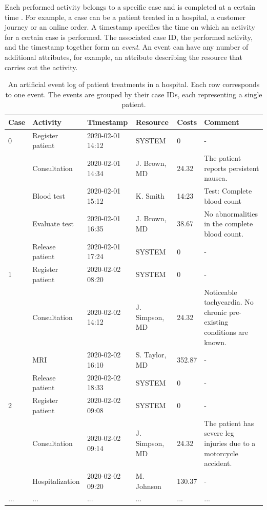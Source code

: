 Each performed activity belongs to a specific case and is completed at a certain time \cite{DBLP:conf/bpm/AalstAM11}.
For example, a case can be a patient treated in a hospital, a customer journey or an online order.
A timestamp specifies the time on which an activity for a certain case is performed.
The associated case ID, the performed activity, and the timestamp together form an \textit{event}.
An event can have any number of additional attributes, for example, an attribute describing the resource that carries out the activity.
\begin{table}[htbp!]
	\small
	\setlength\tabcolsep{3pt}
	\begin{tabularx}{\textwidth}{lllllp{4.5cm}}
		\toprule
		\textbf{Case} & \textbf{Activity}          & \textbf{Timestamp} & \textbf{Resource} & \textbf{Costs} & \textbf{Comment}  \\
		\midrule
		0                & Register patient           & 2020-02-01 14:12   & SYSTEM            & 0             & -     \\
		& Consultation               & 2020-02-01 14:34   & J. Brown, MD    & 24.32         & The patient reports persistent nausea.   \\
		& Blood test                 & 2020-02-01 15:12   & K. Smith         & 14:23         & Test: Complete blood count    \\
		& Evaluate test  & 2020-02-01 16:35   & J. Brown, MD    & 38.67         &No abnormalities in the complete blood count.   \\
		& Release patient            & 2020-02-01 17:24   & SYSTEM            & 0             & -  \\
		\midrule
		1                & Register patient           & 2020-02-02 08:20   & SYSTEM            & 0             & -  \\
		& Consultation               & 2020-02-02 14:12   & J. Simpson, MD  & 24.32         & Noticeable tachycardia. No chronic pre-existing conditions are known.    \\
		& MRI & 2020-02-02 16:10   & S. Taylor, MD   & 352.87        & -    \\
		& Release patient            & 2020-02-02 18:33   & SYSTEM            & 0             & -   \\
		\midrule
		2                & Register patient           & 2020-02-02 09:08   & SYSTEM            & 0             & -    \\
		& Consultation               & 2020-02-02 09:14   & J. Simpson, MD  & 24.32         & The patient has severe leg injuries due to a motorcycle accident.  \\
		& Hospitalization       & 2020-02-02 09:20   & M. Johnson      & 130.37        & -     \\
		...              & ...                        & ...                & ...               & ...           & ...     \\
		\bottomrule
	\end{tabularx}
	\caption[Artificial event log of patient treatments in a hospital]{An artificial event log of patient treatments in a hospital. Each row corresponds to one event. The events are grouped by their case IDs, each representing a single patient.}
	\label{tab:event-log}
\end{table}


